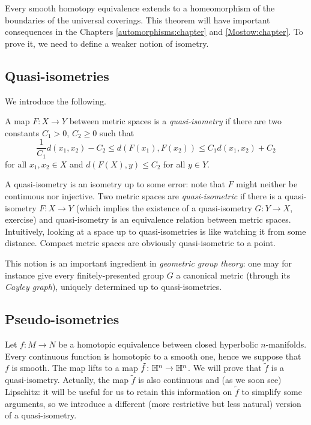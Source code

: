 Every smooth homotopy equivalence extends to a homeomorphism of the boundaries of the universal coverings. This theorem will have important consequences in the Chapters \ref{automorphisms:chapter} and \ref{Mostow:chapter}.
To prove it, we need to define a weaker notion of isometry.

\subsection{Quasi-isometries}

We introduce the following.

\begin{defn} A map $F\colon X \to Y$ between metric spaces is a \emph{quasi-isometry} if there are two constants $C_1>0$, $C_2\geqslant 0$ such that
$$\frac 1 {C_1} d(x_1,x_2) - C_2 \leqslant d(F(x_1), F(x_2)) \leqslant C_1d(x_1,x_2) + C_2$$
for all $x_1,x_2 \in X$ and $d(F(X),y)\leqslant C_2$ for all $y\in Y$.
\end{defn}
A quasi-isometry is an isometry up to some error: note that $F$ might neither be continuous nor injective. Two metric spaces are \emph{quasi-isometric} if there is a quasi-isometry $F\colon X \to Y$ (which implies the existence of a quasi-isometry $G\colon Y\to X$, exercise) and quasi-isometry is an equivalence relation between metric spaces. Intuitively, looking at a space up to quasi-isometries is like watching it from some distance. Compact metric spaces are obviously quasi-isometric to a point. 

This notion is an important ingredient in \emph{geometric group theory}: one may for instance give every finitely-presented group $G$ a canonical metric (through its \emph{Cayley graph}), uniquely determined up to quasi-isometries. 

\subsection{Pseudo-isometries}
Let $f\colon M \to N$ be a homotopic equivalence between closed hyperbolic $n$-manifolds. Every continuous function is homotopic to a smooth one, hence we suppose that $f$ is smooth. The map lifts to a map $\tilde f\colon \mathbb{H}^n \to \mathbb{H}^n$. We will prove that $\tilde f$ is a quasi-isometry. Actually, the map $\tilde f$ is also continuous and (as we soon see) Lipschitz: it will be useful for us to retain this information on $\tilde f$ to simplify some arguments, so we introduce a different (more restrictive but less natural) version of a quasi-isometry.

